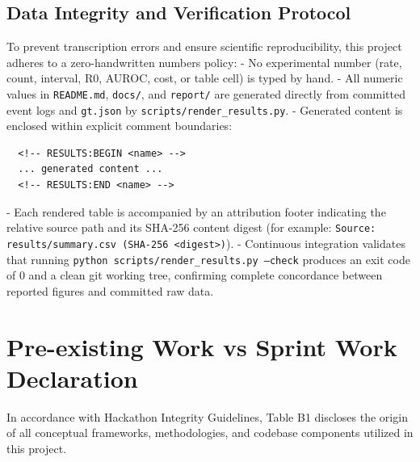 \documentclass[11pt,a4paper]{article}
\begin{document}
\subsection{Data Integrity and Verification Protocol}
To prevent transcription errors and ensure scientific reproducibility, this project adheres to a zero-handwritten numbers policy:
- No experimental number (rate, count, interval, R0, AUROC, cost, or table cell) is typed by hand.
- All numeric values in \texttt{README.md}, \texttt{docs/}, and \texttt{report/} are generated directly from committed event logs and \texttt{gt.json} by \texttt{scripts/render\_results.py}.
- Generated content is enclosed within explicit comment boundaries:
\begin{verbatim}
  <!-- RESULTS:BEGIN <name> -->
  ... generated content ...
  <!-- RESULTS:END <name> -->
\end{verbatim}
- Each rendered table is accompanied by an attribution footer indicating the relative source path and its SHA-256 content digest (for example: \texttt{Source: results/summary.csv (SHA-256 <digest>)}).
- Continuous integration validates that running \texttt{python scripts/render\_results.py --check} produces an exit code of 0 and a clean git working tree, confirming complete concordance between reported figures and committed raw data.


\section{Pre-existing Work vs Sprint Work Declaration}

In accordance with Hackathon Integrity Guidelines, Table B1 discloses the origin of all conceptual frameworks, methodologies, and codebase components utilized in this project.
\end{document}
